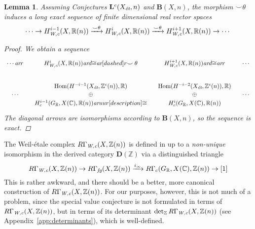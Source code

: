 \documentclass[10pt,a4paper,oneside]{article}
\DeclareMathOperator{\Hom}{Hom}
\newcommand{\CC}{\mathbb{C}}
\newcommand{\RR}{\mathbb{R}}
\newcommand{\ZZ}{\mathbb{Z}}
\renewcommand{\det}{\operatorname{det}}
\newcommand{\ar}{\text{\it ar}}
\newcommand{\et}{\text{\it \'{e}t}}
\newcommand{\fg}{\text{\it fg}}
\newcommand{\Wc}{\text{\it W,c}}
\theoremstyle{myplain}
\newtheorem{lemma}[theorem]{Lemma}
\theoremstyle{mydefinition}
\numberwithin{equation}{section}
\begin{document}
\begin{lemma}
  \label{lemma:smile-theta}
  Assuming Conjectures $\mathbf{L}^c (X_\et,n)$ and $\mathbf{B} (X,n)$, the
  morphism $\smile\theta$ induces a long exact sequence of finite dimensional
  real vector spaces
  \[ \cdots \to H^{i-1}_\Wc (X, \RR (n))
    \xrightarrow{\smile\theta}
    H^i_\Wc (X, \RR (n))
    \xrightarrow{\smile\theta}
    H^{i+1}_\Wc (X, \RR (n)) \to \cdots \]

  \begin{proof}
    We obtain a sequence
    \[ \begin{tikzcd}[column sep=1em]
        \cdots\ar{r} & H^i_\Wc (X, \RR(n))\ar{d}{\cong}\ar[dashed]{r}{\smile\theta} & H^{i+1}_\Wc (X, \RR(n))\ar{d}{\cong} \ar{r} & \cdots \\
        & \Hom (H^{-i-1} (X_\et, \ZZ^c (n)), \RR) & \Hom (H^{-i-2} (X_\et, \ZZ^c (n)), \RR) \\[-2em]
        \cdots & \oplus & \oplus & \cdots \\[-2em]
        & H_c^{i-1} (G_\RR, X (\CC), \RR (n))\ar{uur}[description]{\cong} & H_c^i (G_\RR, X (\CC), \RR (n))
      \end{tikzcd} \]
    The diagonal arrows are isomorphisms according to $\mathbf{B} (X,n)$,
    so the sequence is exact.
  \end{proof}
\end{lemma}

The Weil-\'{e}tale complex $R\Gamma_\Wc (X, \ZZ(n))$ is defined in
\cite[\S 7]{Beshenov-Weil-etale-1} up to a \emph{non-unique} isomorphism in the
derived category $\mathbf{D} (\ZZ)$ via a distinguished triangle
\begin{equation}
  \label{eqn:triangle-defining-RGamma-Wc}
  R\Gamma_\Wc (X, \ZZ(n)) \to R\Gamma_\fg (X,\ZZ(n)) \xrightarrow{i_\infty}
  R\Gamma_c (G_\RR, X (\CC), \ZZ (n)) \to [1]
\end{equation}
This is rather awkward, and there should be a better, more canonical
construction of $R\Gamma_\Wc (X, \ZZ(n))$. For our purposes, however, this is
not much of a problem, since the special value conjecture is not formulated in
terms of $R\Gamma_\Wc (X, \ZZ (n))$, but in terms of its determinant
$\det_\ZZ R\Gamma_\Wc (X, \ZZ(n))$ (see Appendix~\ref{app:determinants}), which
is well-defined.
\end{document}
